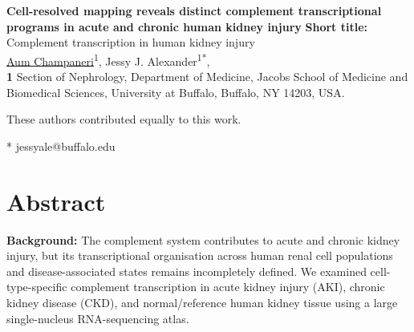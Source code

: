 \documentclass[10pt,letterpaper]{article}
\begin{document}
\vspace*{0.2in}

\begin{flushleft}
{\Large
\textbf{Cell-resolved mapping reveals distinct complement transcriptional programs in acute and chronic human kidney injury} %
}
\newline
\textbf{Short title:} Complement transcription in human kidney injury
\newline
\\
\href{https://orcid.org/0009-0006-0385-9832}{Aum Champaneri}\textsuperscript{1\ddag},
Jessy J. Alexander\textsuperscript{1*\ddag},
\\
\bigskip
\textbf{1} Section of Nephrology, Department of Medicine, Jacobs School of Medicine and Biomedical Sciences, University at Buffalo, Buffalo, NY 14203, USA.
\\
\bigskip

%
%
\ddag These authors contributed equally to this work.



* jessyale@buffalo.edu

\end{flushleft}

\section*{Abstract}

\textbf{Background:}
The complement system contributes to acute and chronic kidney injury, but its transcriptional organisation across human renal cell populations and disease-associated states remains incompletely defined. We examined cell-type-specific complement transcription in acute kidney injury (AKI), chronic kidney disease (CKD), and normal/reference human kidney tissue using a large single-nucleus RNA-sequencing atlas.
\end{document}
